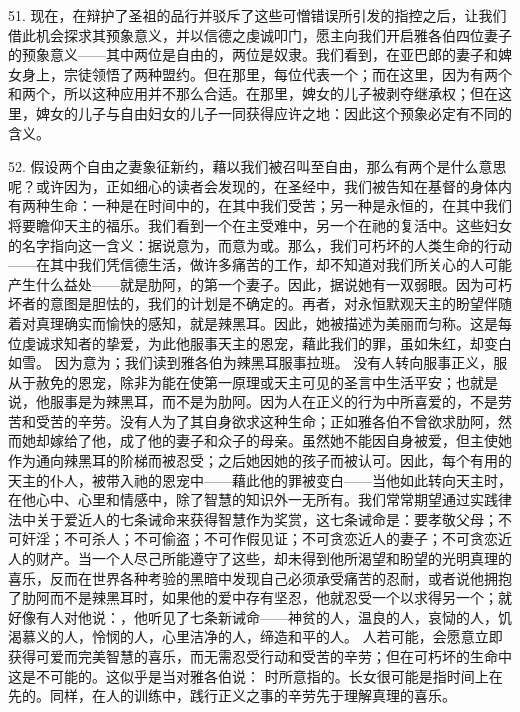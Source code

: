 51. 现在，在辩护了圣祖的品行并驳斥了这些可憎错误所引发的指控之后，让我们借此机会探求其预象意义，并以信德之虔诚叩门，愿主向我们开启雅各伯四位妻子的预象意义——其中两位是自由的，两位是奴隶。我们看到，在亚巴郎的妻子和婢女身上，宗徒领悟了两种盟约。但在那里，每位代表一个；而在这里，因为有两个和两个，所以这种应用并不那么合适。在那里，婢女的儿子被剥夺继承权；但在这里，婢女的儿子与自由妇女的儿子一同获得应许之地：因此这个预象必定有不同的含义。\par

52. 假设两个自由之妻象征新约，藉以我们被召叫至自由，那么有两个是什么意思呢？或许因为，正如细心的读者会发现的，在圣经中，我们被告知在基督的身体内有两种生命：一种是在时间中的，在其中我们受苦；另一种是永恒的，在其中我们将要瞻仰天主的福乐。我们看到一个在主受难中，另一个在祂的复活中。这些妇女的名字指向这一含义：据说意为，而意为或。那么，我们可朽坏的人类生命的行动——在其中我们凭信德生活，做许多痛苦的工作，却不知道对我们所关心的人可能产生什么益处——就是肋阿，的第一个妻子。因此，据说她有一双弱眼。因为可朽坏者的意图是胆怯的，我们的计划是不确定的。再者，对永恒默观天主的盼望伴随着对真理确实而愉快的感知，就是辣黑耳。因此，她被描述为美丽而匀称。这是每位虔诚求知者的挚爱，为此他服事天主的恩宠，藉此我们的罪，虽如朱红，却变白如雪。 因为意为；我们读到雅各伯为辣黑耳服事拉班。 没有人转向服事正义，服从于赦免的恩宠，除非为能在使第一原理或天主可见的圣言中生活平安；也就是说，他服事是为辣黑耳，而不是为肋阿。因为人在正义的行为中所喜爱的，不是劳苦和受苦的辛劳。没有人为了其自身欲求这种生命；正如雅各伯不曾欲求肋阿，然而她却嫁给了他，成了他的妻子和众子的母亲。虽然她不能因自身被爱，但主使她作为通向辣黑耳的阶梯而被忍受；之后她因她的孩子而被认可。因此，每个有用的天主的仆人，被带入祂的恩宠中——藉此他的罪被变白——当他如此转向天主时，在他心中、心里和情感中，除了智慧的知识外一无所有。我们常常期望通过实践律法中关于爱近人的七条诫命来获得智慧作为奖赏，这七条诫命是：要孝敬父母；不可奸淫；不可杀人；不可偷盗；不可作假见证；不可贪恋近人的妻子；不可贪恋近人的财产。当一个人尽己所能遵守了这些，却未得到他所渴望和盼望的光明真理的喜乐，反而在世界各种考验的黑暗中发现自己必须承受痛苦的忍耐，或者说他拥抱了肋阿而不是辣黑耳时，如果他的爱中存有坚忍，他就忍受一个以求得另一个；就好像有人对他说：，他听见了七条新诫命——神贫的人，温良的人，哀恸的人，饥渴慕义的人，怜悯的人，心里洁净的人，缔造和平的人。 人若可能，会愿意立即获得可爱而完美智慧的喜乐，而无需忍受行动和受苦的辛劳；但在可朽坏的生命中这是不可能的。这似乎是当对雅各伯说：  时所意指的。长女很可能是指时间上在先的。同样，在人的训练中，践行正义之事的辛劳先于理解真理的喜乐。\par

